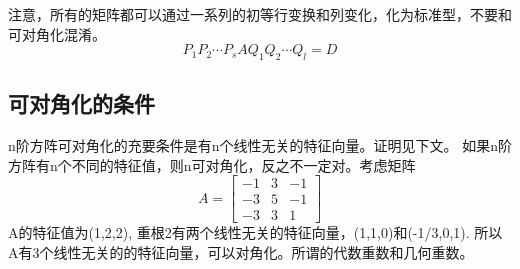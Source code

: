 \documentclass[]{article}
\begin{document}
注意，所有的矩阵都可以通过一系列的初等行变换和列变化，化为标准型，不要和可对角化混淆。
\[ P_1 P_2\cdots P_s A Q_1 Q_2 \cdots Q_l = D \]

\subsection{可对角化的条件}
n阶方阵可对角化的充要条件是有n个线性无关的特征向量。证明见下文。
如果n阶方阵有n个不同的特征值，则n可对角化，反之不一定对。考虑矩阵
\begin{equation}
A = 
\begin{bmatrix}
-1 & 3 & -1 \\
-3 & 5 & -1 \\
-3 & 3 & 1
\end{bmatrix}
\end{equation}
A的特征值为(1,2,2), 重根2有两个线性无关的特征向量，(1,1,0)和(-1/3,0,1). 所以A有3个线性无关的的特征向量，可以对角化。所谓的代数重数和几何重数。
\end{document}
